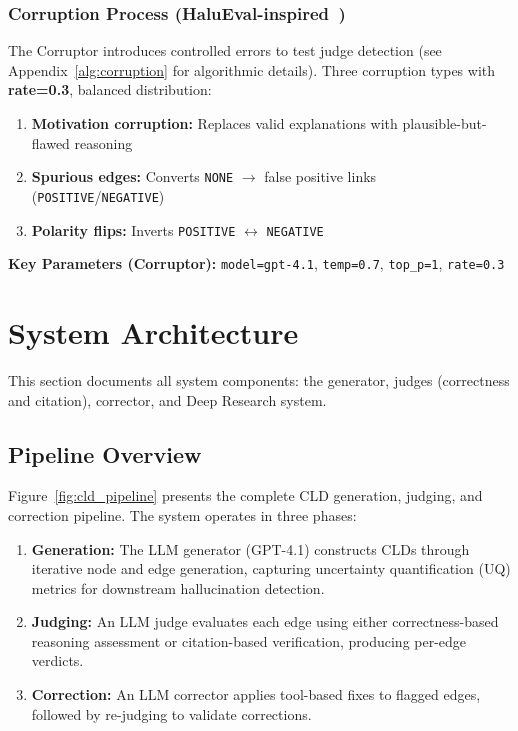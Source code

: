 \subsubsection{Corruption Process (HaluEval-inspired~\cite{li2023halueval})}
The Corruptor introduces controlled errors to test judge detection (see Appendix~\ref{alg:corruption} for algorithmic details). Three corruption types with \textbf{rate=0.3}, balanced distribution:
\begin{enumerate}[noitemsep]
    \item \textbf{Motivation corruption:} Replaces valid explanations with plausible-but-flawed reasoning
    \item \textbf{Spurious edges:} Converts \texttt{NONE} $\rightarrow$ false positive links (\texttt{POSITIVE}/\texttt{NEGATIVE})
    \item \textbf{Polarity flips:} Inverts \texttt{POSITIVE} $\leftrightarrow$ \texttt{NEGATIVE}
\end{enumerate}

\textbf{Key Parameters (Corruptor):} \texttt{model=gpt-4.1}, \texttt{temp=0.7}, \texttt{top\_p=1}, \texttt{rate=0.3}

\section{System Architecture}
\label{sec:system_architecture}

This section documents all system components: the generator, judges (correctness and citation), corrector, and Deep Research system.

\subsection{Pipeline Overview}
\label{sec:methods_system_overview}

Figure~\ref{fig:cld_pipeline} presents the complete CLD generation, judging, and correction pipeline. The system operates in three phases:

\begin{enumerate}[noitemsep]
    \item \textbf{Generation:} The LLM generator (GPT-4.1) constructs CLDs through iterative node and edge generation, capturing uncertainty quantification (UQ) metrics for downstream hallucination detection.
    \item \textbf{Judging:} An LLM judge evaluates each edge using either correctness-based reasoning assessment or citation-based verification, producing per-edge verdicts.
    \item \textbf{Correction:} An LLM corrector applies tool-based fixes to flagged edges, followed by re-judging to validate corrections.
\end{enumerate}

